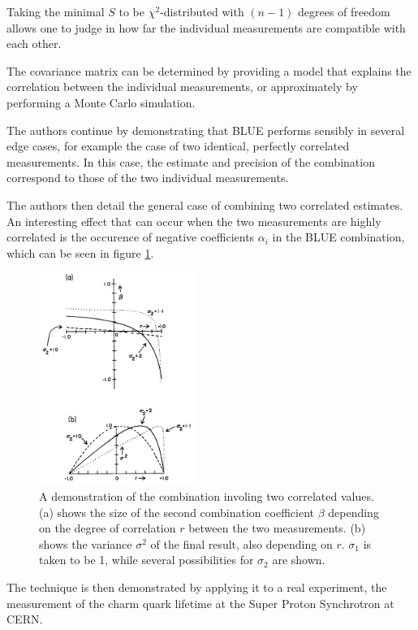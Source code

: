 Taking the minimal $S$ to be $\chi^2$-distributed with $(n - 1)$ degrees of freedom allows one to judge in how far the individual measurements are compatible with each other.

The covariance matrix can be determined by providing a model that explains the correlation between the individual measurements, or approximately by performing a Monte Carlo simulation.

The authors continue by demonstrating that BLUE performs sensibly in several edge cases, for example the case of two identical, perfectly correlated measurements.
In this case, the estimate and precision of the combination correspond to those of the two individual measurements.

The authors then detail the general case of combining two correlated estimates.
An interesting effect that can occur when the two measurements are highly correlated is the occurence of negative coefficients $α_i$ in the BLUE combination, which can be seen in figure \ref{simple}.

\begin{figure}
  \centering
  \includegraphics[width=0.45\textwidth]{./figures/simple.pdf}
  \caption{A demonstration of the combination involing two correlated values. (a) shows the size of the second combination coefficient $β$ depending on the degree of correlation $r$ between the two measurements. (b) shows the variance $σ^2$ of the final result, also depending on $r$. $σ_1$ is taken to be 1, while several possibilities for $σ_2$ are shown. \cite{lyons}}
  \label{simple}
\end{figure}

The technique is then demonstrated by applying it to a real experiment, the measurement of the charm quark lifetime at the Super Proton Synchrotron at CERN.


